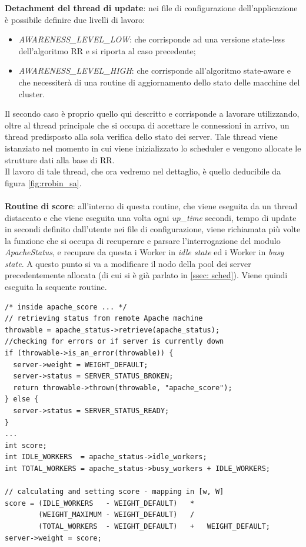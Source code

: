 \documentclass[italian]{tktltiki2}
\begin{document}
\textbf{Detachment del thread di update}: nei file di configurazione dell'applicazione è possibile definire due livelli di lavoro:
	\begin{itemize}
		\item \emph{AWARENESS\_LEVEL\_LOW}: che corrisponde ad una versione state-less dell'algoritmo RR e si riporta al caso precedente;
		\item \emph{AWARENESS\_LEVEL\_HIGH}: che corrisponde all'algoritmo state-aware e che necessiterà di una routine di aggiornamento dello stato delle macchine del cluster.
	\end{itemize}
	Il secondo caso è proprio quello qui descritto e corrisponde a lavorare utilizzando, oltre al thread principale che si occupa di accettare le connessioni in arrivo, un thread predisposto alla sola verifica dello stato dei server. Tale thread viene istanziato nel momento in cui viene inizializzato lo scheduler e vengono allocate le strutture dati alla base di RR. \\
	Il lavoro di tale thread, che ora vedremo nel dettaglio, è quello deducibile da figura \ref{fig:rrobin_sa}.\\\\
\textbf{Routine di score}: all'interno di questa routine, che viene eseguita da un thread distaccato e che viene eseguita una volta ogni \emph{up\_time} secondi, tempo di update in secondi definito dall'utente nei file di configurazione, viene richiamata più volte la funzione che si occupa di recuperare e parsare l'interrogazione del modulo \emph{ApacheStatus}, e recupare da questa i Worker in \emph{idle state} ed i Worker in \emph{busy state}. A questo punto si va a modificare il nodo della pool dei server precedentemente allocata (di cui si è già parlato in \ref{ssec: sched}). Viene quindi eseguita la sequente routine. \\
\begin{lstlisting}
/* inside apache_score ... */
// retrieving status from remote Apache machine
throwable = apache_status->retrieve(apache_status);   
//checking for errors or if server is currently down
if (throwable->is_an_error(throwable)) {
  server->weight = WEIGHT_DEFAULT;
  server->status = SERVER_STATUS_BROKEN;
  return throwable->thrown(throwable, "apache_score");
} else {
  server->status = SERVER_STATUS_READY;
}
...
int score;
int IDLE_WORKERS  = apache_status->idle_workers;
int TOTAL_WORKERS = apache_status->busy_workers + IDLE_WORKERS;

// calculating and setting score - mapping in [w, W]
score = (IDLE_WORKERS   - WEIGHT_DEFAULT)   *
        (WEIGHT_MAXIMUM - WEIGHT_DEFAULT)   /
        (TOTAL_WORKERS  - WEIGHT_DEFAULT)   +   WEIGHT_DEFAULT;
server->weight = score;
\end{lstlisting}
\end{document}

